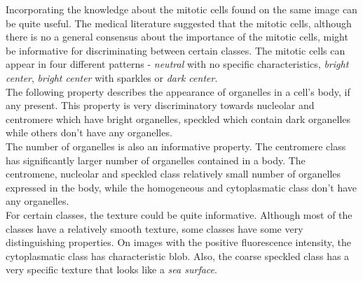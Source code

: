 Incorporating the knowledge about the mitotic cells found on the same image can be quite useful. The medical literature suggested that the mitotic cells, although there is no a general consensus about the importance of the mitotic cells, might be informative for discriminating between certain classes. The mitotic cells can appear in four different patterns - \textit{neutral} with no specific characteristics, \textit{bright center}, \textit{bright center} with sparkles or \textit{dark center}. \\

The following property describes the appearance of organelles in a cell's body, if any present. This property is very discriminatory towards nucleolar and centromere which have bright organelles, speckled which contain dark organelles while others don't have any organelles. \\

The number of organelles is also an informative property. The centromere class has significantly larger number of organelles contained in a body. The centromene, nucleolar and speckled class relatively small number of organelles expressed in the body, while the homogeneous and cytoplasmatic class don't have any organelles. \\

For certain classes, the texture could be quite informative. Although most of the classes have a relatively smooth texture, some classes have some very distinguishing properties. On images with the positive fluorescence intensity, the cytoplasmatic class has characteristic blob. Also, the coarse speckled class has a very specific texture that looks like a \textit{sea surface}. \\



